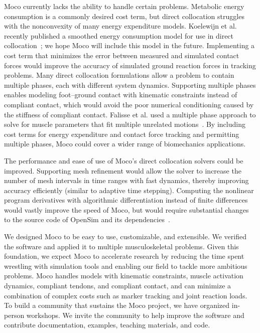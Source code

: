 \documentclass[10pt,letterpaper]{article}
\begin{document}
Moco currently lacks the ability to handle certain problems. Metabolic energy consumption is a commonly desired cost term, but direct collocation struggles with the nonconvexity of many energy expenditure models. Koelewijn et al. recently published a smoothed energy consumption model for use in direct collocation~\cite{Koelewijn:2019}; we hope Moco will include this model in the future. Implementing a cost term that minimizes the error between measured and simulated contact forces would improve the accuracy of simulated ground reaction forces in tracking problems. Many direct collocation formulations allow a problem to contain multiple phases, each with different system dynamics. Supporting multiple phases enables modeling foot–ground contact with kinematic constraints instead of compliant contact, which would avoid the poor numerical conditioning caused by the stiffness of compliant contact. Falisse et al. used a multiple phase approach to solve for muscle parameters that fit multiple unrelated motions~\cite{Falisse:2016}. By including cost terms for energy expenditure and contact force tracking and permitting multiple phases, Moco could cover a wider range of biomechanics applications.

The performance and ease of use of Moco’s direct collocation solvers could be improved. Supporting mesh refinement would allow the solver to increase the number of mesh intervals in time ranges with fast dynamics, thereby improving accuracy efficiently (similar to adaptive time stepping). Computing the nonlinear program derivatives with algorithmic differentiation instead of finite differences would vastly improve the speed of Moco, but would require substantial changes to the source code of OpenSim and its dependencies~\cite{Falisse:2019a}.

We designed Moco to be easy to use, customizable, and extensible. We verified the software and applied it to multiple musculoskeletal problems. Given this foundation, we expect Moco to accelerate research by reducing the time spent wrestling with simulation tools and enabling our field to tackle more ambitious problems. Moco handles models with kinematic constraints, muscle activation dynamics, compliant tendons, and compliant contact, and can minimize a combination of complex costs such as marker tracking and joint reaction loads. To build a community that sustains the Moco project, we have organized in-person workshops. We invite the community to help improve the software and contribute documentation, examples, teaching materials, and code.
\end{document}
